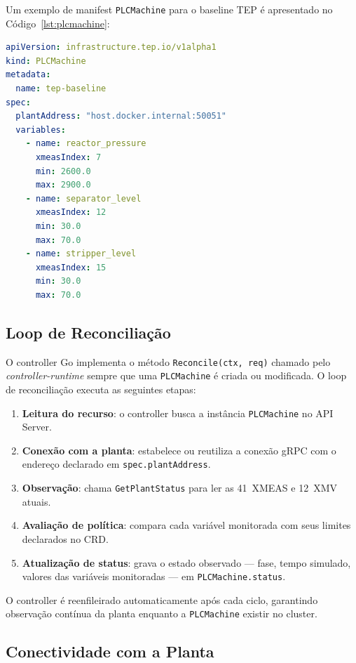 Um exemplo de manifest \texttt{PLCMachine} para o baseline TEP é apresentado no Código~\ref{lst:plcmachine}:

\begin{lstlisting}[language=yaml, float=htbp, caption={Manifest \texttt{PLCMachine} para o baseline TEP}, label={lst:plcmachine}]
apiVersion: infrastructure.tep.io/v1alpha1
kind: PLCMachine
metadata:
  name: tep-baseline
spec:
  plantAddress: "host.docker.internal:50051"
  variables:
    - name: reactor_pressure
      xmeasIndex: 7
      min: 2600.0
      max: 2900.0
    - name: separator_level
      xmeasIndex: 12
      min: 30.0
      max: 70.0
    - name: stripper_level
      xmeasIndex: 15
      min: 30.0
      max: 70.0
\end{lstlisting}

\subsection{Loop de Reconciliação}

O controller Go implementa o método \texttt{Reconcile(ctx, req)} chamado pelo \textit{controller-runtime} sempre que uma \texttt{PLCMachine} é criada ou modificada. O loop de reconciliação executa as seguintes etapas:

\begin{enumerate}
  \item \textbf{Leitura do recurso}: o controller busca a instância \texttt{PLCMachine} no API Server.
  \item \textbf{Conexão com a planta}: estabelece ou reutiliza a conexão gRPC com o endereço declarado em \texttt{spec.plantAddress}.
  \item \textbf{Observação}: chama \texttt{GetPlantStatus} para ler as 41~XMEAS e 12~XMV atuais.
  \item \textbf{Avaliação de política}: compara cada variável monitorada com seus limites declarados no CRD.
  \item \textbf{Atualização de status}: grava o estado observado — fase, tempo simulado, valores das variáveis monitoradas — em \texttt{PLCMachine.status}.
\end{enumerate}

O controller é reenfileirado automaticamente após cada ciclo, garantindo observação contínua da planta enquanto a \texttt{PLCMachine} existir no cluster.

\subsection{Conectividade com a Planta}

